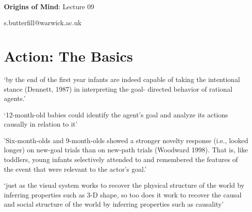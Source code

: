 \documentclass[12pt]{extarticle}
\date{}
\makeatletter
\def \ititle {Origins of Mind}
\def \isubtitle {Lecture 08}
\def \iemail{s.butterfill@warwick.ac.uk}
\makeatother
\begin{document}
\begin{multicols}{3}

\setlength\footnotesep{1em}







\def \ititle {Origins of Mind}
 
\def \isubtitle {Lecture 09}
 
 
 
\
 
 
 
\begin{center}
 
{\Large
 
\textbf{\ititle}: \isubtitle
 
}
 
 
 
\iemail %
 
\end{center}
 
 
 
\section{Action: The Basics}
 
‘by the end of the first year infants are indeed capable of taking the intentional stance (Dennett, 1987) in interpreting the goal- directed behavior of rational agents.’
\citep[p.\ 184]{Gergely:1995sq}
 
‘12-month-old babies could identify the agent’s goal and analyze its actions causally in relation to it’
\citep[p.\ 190]{Gergely:1995sq}
 
'Six-month-olds and 9-month-olds showed a stronger novelty response (i.e., looked longer) on new-goal trials than on new-path trials (Woodward 1998). That is, like toddlers, young infants selectively attended to and remembered the features of the event that were relevant to the actor’s goal.'
\citep[p.\ 153]{woodward:2001_making}
 
‘just as the visual system works to recover the physical structure of the world by inferring properties such as 3-D shape, so too does it work to recover the causal and social structure of the world by inferring properties such as causality’
\citep[p.\ 299]{Scholl:2000eq}
 

\end{multicols}
\end{document}

